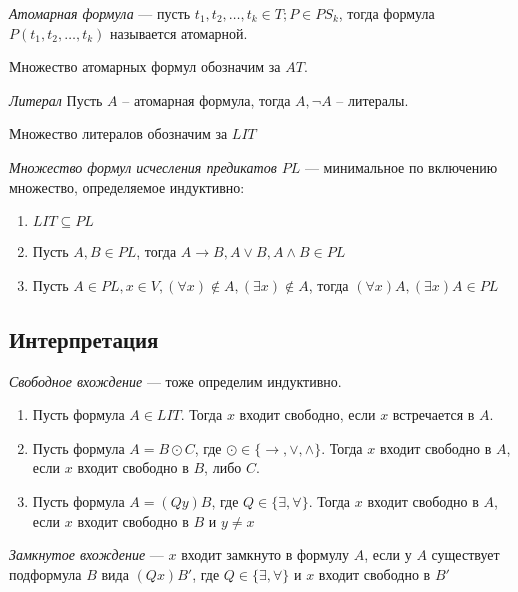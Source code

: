 \begin{definition}
  \emph{Атомарная формула} --- пусть $t_1, t_2, \ldots, t_k \in T; P \in PS_k$, тогда формула $P(t_1, t_2, \ldots, t_k)$ называется атомарной.
\end{definition}

Множество атомарных формул обозначим за $AT$. 

\begin{definition}
  \emph{Литерал}  Пусть $A$ -- атомарная формула, тогда $A, \neg A$ -- литералы.
\end{definition}

Множество литералов обозначим за $LIT$


\begin{definition}
  \emph{Множество формул исчесления предикатов $PL$} --- минимальное по включению множество, определяемое индуктивно:
  \begin{enumerate}
  	\item $LIT \subseteq PL$
    \item Пусть $A, B \in PL$, тогда $A \to B, A \vee B, A \wedge B \in PL$ 
    \item Пусть $A \in PL, x \in V, (\forall x) \notin A, (\exists x) \notin A$, тогда $(\forall x)A, (\exists x)A \in PL$
  \end{enumerate}
\end{definition}

\subsection{Интерпретация}

\begin{definition}
  \emph{Свободное вхождение} --- тоже определим индуктивно. 
  \begin{enumerate}
  	\item Пусть формула $A \in LIT$. Тогда $x$ входит свободно, если $x$ встречается в $A$.
    \item Пусть формула $A = B \odot C$, где $\odot \in \{ \to, \vee, \wedge \}$. Тогда $x$ входит свободно в $A$, если $x$ входит свободно в $B$, либо $C$.
    \item Пусть формула $A = (Qy)B$, где $Q \in \{ \exists, \forall \}$. Тогда $x$ входит свободно в $A$, если $x$ входит свободно в $B$ и $y \neq x$
  \end{enumerate}
\end{definition}

\begin{definition}
  \emph{Замкнутое вхождение} --- $x$ входит замкнуто в формулу $A$, если у $A$ существует подформула $B$ вида $(Qx)B'$, где $Q \in \{ \exists, \forall \}$ и $x$ входит свободно в $B'$
\end{definition}

